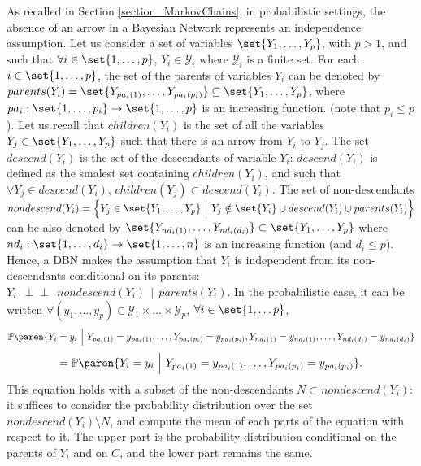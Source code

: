 As recalled in Section \ref{section_MarkovChains}, 
in probabilistic settings, 
the absence of an arrow in a Bayesian Network
represents an independence assumption. 
Let us consider a set of variables
$\set{Y_1, \ldots, Y_p}$, with $p>1$, 
and such that 
$\forall i \in \set{1,\ldots,p}$, $Y_i \in \mathcal{Y}_i$ 
where $\mathcal{Y}_i$ is a finite set.
For each $i \in \set{1,\ldots,p}$, 
the set of the parents of variables $Y_i$
can be denoted by 
$parents(Y_i) = \set{ Y_{pa_i(1)}, \ldots, Y_{pa_i(p_i)} } \subseteq \set{ Y_1,\ldots,Y_p }$,
where $pa_i: \set{1,\ldots,p_i} \rightarrow \set{1,\ldots,p}$ is an increasing function.
(note that $p_i \leqslant p$).
Let us recall that $children(Y_i)$ is the set of all the variables $Y_j \in \set{ Y_1,\ldots,Y_p }$ 
such that there is an arrow from $Y_i$ to $Y_j$.
The set $descend(Y_i)$ is the set of the descendants of variable $Y_i$:
$descend(Y_i)$ is defined as the smalest set containing $children(Y_i)$,
and such that $\forall Y_j \in descend(Y_i)$, $children(Y_j) \subset descend(Y_i)$.
The set of non-descendants 
$nondescend(Y_i) = \Big\{ Y_j \in \set{ Y_1,\ldots,Y_p } \ \Big\vert \ Y_j \notin \set{Y_i} \cup descend(Y_i) \cup parents(Y_i)  \Big\}$
can be also denoted by $\set{ Y_{nd_i(1)}, \ldots, Y_{nd_i(d_i)} } \subset \set{ Y_1,\ldots,Y_p }$
where $nd_i: \set{1,\ldots,d_i} \rightarrow \set{1,\ldots,n}$ is an increasing function (and $d_i \leqslant p$).
Hence, a DBN makes the assumption that
$Y_i$ is independent from its non-descendants conditional on its parents:
$Y_i \ \ \perp\!\!\!\perp \ \ nondescend(Y_i) \ \ \vert \ \ parents(Y_i)$.
In the probabilistic case, it can be written
$\forall (y_1,\ldots,y_p) \in \mathcal{Y}_1 \times \ldots \times \mathcal{Y}_p$,
$\forall i \in \set{1,\ldots p}$,
\[\mathbb{P} \paren{ Y_i=y_i \ \Big\vert \ Y_{pa_i(1)}=y_{pa_i(1)},\ldots, Y_{pa_i(p_i)}=y_{pa_i(p_i)}, Y_{nd_i(1)} = y_{nd_i(1)}, \ldots, Y_{nd_i(d_i)} = y_{nd_i(d_i)} }  \]
\begin{equation}
\label{DBNindep_prob} 
= \mathbb{P} \paren{ Y_i=y_i \ \Big\vert \ Y_{pa_i(1)}=y_{pa_i(1)},\ldots, Y_{pa_i(p_i)}=y_{pa_i(p_i)} }.
\end{equation}
This equation holds with a subset of the non-descendants $N \subset nondescend(Y_i)$: 
it suffices to consider the probability distribution 
over the set $nondescend(Y_i)\setminus N$, 
and compute the mean of each parts of the equation with respect to it.
The upper part is the probability distribution conditional on the parents of $Y_i$ and on $C$,
and the lower part remains the same.


